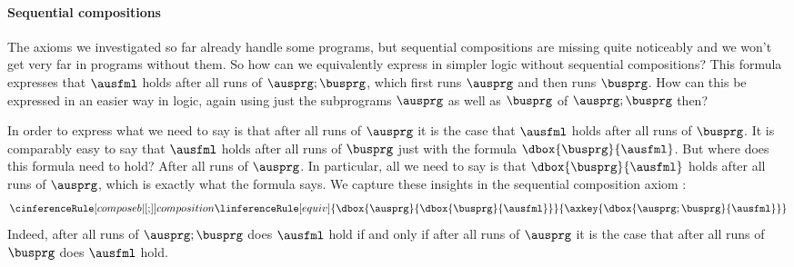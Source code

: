 \documentclass[11pt,twoside]{scrartcl}
\begin{document}
\paragraph{Sequential compositions}

The axioms we investigated so far already handle some programs, but sequential compositions are missing quite noticeably and we won't get very far in programs without them.
So how can we equivalently express \m{\dbox{\ausprg;\busprg}{\ausfml}} in simpler logic without sequential compositions?
This formula expresses that $\ausfml$ holds after all runs of $\ausprg;\busprg$, which first runs $\ausprg$ and then runs $\busprg$.
How can this be expressed in an easier way in logic, again using just the subprograms $\ausprg$ as well as $\busprg$ of $\ausprg;\busprg$ then?

In order to express \m{\dbox{\ausprg;\busprg}{\ausfml}} what we need to say is that after all runs of $\ausprg$ it is the case that $\ausfml$ holds after all runs of $\busprg$.
It is comparably easy to say that $\ausfml$ holds after all runs of $\busprg$ just with the formula \(\dbox{\busprg}{\ausfml}\).
But where does this formula need to hold?
After all runs of $\ausprg$.
In particular, all we need to say is that \(\dbox{\busprg}{\ausfml}\) holds after all runs of $\ausprg$, which is exactly what the formula \m{\dbox{\ausprg}{\dbox{\busprg}{\ausfml}}} says.
We capture these insights in the sequential composition axiom :
\[
\cinferenceRule[composeb|$\dibox{{;}}$]{composition} %
{\linferenceRule[equiv]
  {\dbox{\ausprg}{\dbox{\busprg}{\ausfml}}}
  {\axkey{\dbox{\ausprg;\busprg}{\ausfml}}}
}{}%
\]
Indeed, after all runs of $\ausprg;\busprg$ does $\ausfml$ hold if and only if after all runs of $\ausprg$ it is the case that after all runs of $\busprg$ does $\ausfml$ hold.
\end{document}
